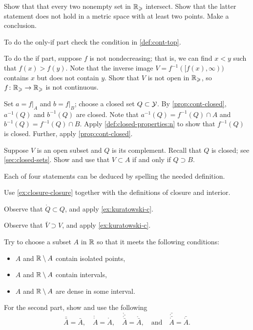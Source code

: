 \begin{multicols}{2}
Show that that every two nonempty set in $\mathbb{R}_\geqslant$ intersect.
Show that the latter statement does not hold in a metric space with at least two points.
Make a conclusion.

To do the only-if part check the condition in \ref{def:cont-top}.

To do the if part, suppose $f$ is not nondecreasing;
that is, we can find $x<y$ such that $f(x)>f(y)$.
Note that the inverse image $V=f^{-1}([f(x),\infty))$ contains $x$ but does not contain $y$.
Show that $V$ is not open in $\mathbb{R}_\geqslant$, so $f\colon\mathbb{R}_\geqslant\to\mathbb{R}_\geqslant$ is not continuous. 

Set $a=f|_A$ and $b=f|_{B}$; choose a closed set $Q\subset \mathcal{Y}$.
By \ref{prop:cont-closed}, $a^{-1}(Q)$ and $b^{-1}(Q)$ are closed.
Note that $a^{-1}(Q)=f^{-1}(Q)\cap A$ and $b^{-1}(Q)=f^{-1}(Q)\cap B$.
Apply \ref{def:closed-properties:n} to show that $f^{-1}(Q)$ is closed.
Further, apply \ref{prop:cont-closed}.

Suppose $V$ is an open subset and $Q$ is its complement.
Recall that $Q$ is closed; see \ref{sec:closed-sets}.
Show and use that $V\subset A$ if and only if $Q\supset B$.

Each of four statements can be deduced by spelling the needed definition.

 Use \ref{ex:closure-closure} together with the definitions of closure and interior.

Observe that $\mathring Q\subset Q$, and apply \ref{ex:kuratowski-c}.

Observe that $\bar V\supset V$, and apply \ref{ex:kuratowski-c}.

Try to choose a subset $A$ in $\mathbb{R}$ so that it meets the following conditions:
\begin{itemize}
\item $A$ and $\mathbb{R}\setminus A$ contain isolated points,
\item $A$ and $\mathbb{R}\setminus A$ contain intervals,
\item $A$ and $\mathbb{R}\setminus A$ are dense in some interval.
\end{itemize}
For the second part, show and use the following 
\[
\bar{\bar A}=\bar A,
\quad
\mathring{\mathring A}=\mathring A,
\quad
\mathring{\bar{\mathring{\bar A}}}=\mathring{\bar A},
\quad\text{and}\quad 
\bar{\mathring{\bar{\mathring A}}}=\bar{\mathring A}.
\]


\end{multicols}
